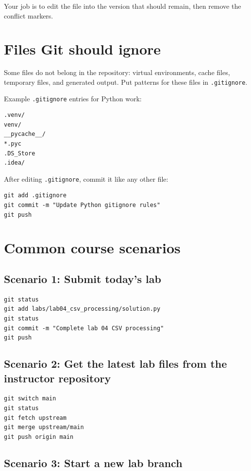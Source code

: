 \documentclass[11pt]{article}
\begin{document}
Your job is to edit the file into the version that should remain, then remove the conflict markers.

\section{Files Git should ignore}

Some files do not belong in the repository: virtual environments, cache files, temporary files, and generated output.  Put patterns for these files in \texttt{.gitignore}.

Example \texttt{.gitignore} entries for Python work:

\begin{lstlisting}[style=terminal]
.venv/
venv/
__pycache__/
*.pyc
.DS_Store
.idea/
\end{lstlisting}

After editing \texttt{.gitignore}, commit it like any other file:

\begin{lstlisting}[style=terminal]
git add .gitignore
git commit -m "Update Python gitignore rules"
git push
\end{lstlisting}

\section{Common course scenarios}

\subsection{Scenario 1: Submit today's lab}

\begin{lstlisting}[style=terminal]
git status
git add labs/lab04_csv_processing/solution.py
git status
git commit -m "Complete lab 04 CSV processing"
git push
\end{lstlisting}

\subsection{Scenario 2: Get the latest lab files from the instructor repository}

\begin{lstlisting}[style=terminal]
git switch main
git status
git fetch upstream
git merge upstream/main
git push origin main
\end{lstlisting}

\subsection{Scenario 3: Start a new lab branch}
\end{document}
